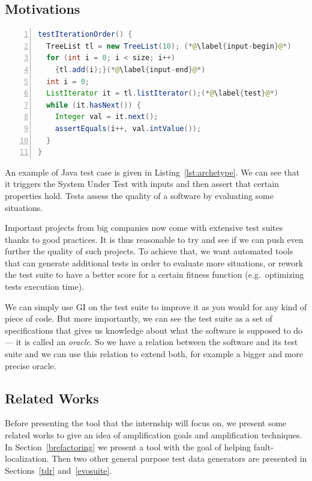 \documentclass[11pt]{sdm}
\newcommand{\addref}[1]{\colorbox{TealBlue!100}{\textcolor{white}{\textbf{$[$\ifx&#1&\ \else#1\fi$]$}}}}
\begin{document}

\subsection{Motivations}
\label{motiv_tsa}

\begin{lstlisting}[caption={An archetypal example of an object-oriented test case  (taken from the Apache Commons Collections, in the class TreeListTest, line 270)},label=lst:archetype,float,language=java,numbers=left]
testIterationOrder() {
  TreeList tl = new TreeList(10); (*@\label{input-begin}@*)
  for (int i = 0; i < size; i++)
    {tl.add(i);}(*@\label{input-end}@*)
  int i = 0;
  ListIterator it = tl.listIterator();(*@\label{test}@*)
  while (it.hasNext()) {
    Integer val = it.next();
    assertEquals(i++, val.intValue());
  }
}
\end{lstlisting}

An example of Java test case is given in Listing~\ref{lst:archetype}.
We can see that it triggers the System Under Test with inputs and then assert that certain properties hold.
Tests assess the quality of a software by evaluating some situations.

Important projects from big companies now come with extensive test suites thanks to good practices.
It is thus reasonable to try and see if we can push even further the quality of such projects.
To achieve that, we want automated tools that can generate additional tests in order to evaluate more situations, or rework the test suite to have a better score for a certain fitness function (e.g.\ optimizing tests execution time).

We can simply use GI on the test suite to improve it as you would for any kind of piece of code.
But more importantly, we can see the test suite as a set of specifications that gives us knowledge about what the software is supposed to do --- it is called an \textit{oracle}.
So we have a relation between the software and its test suite and we can use this relation to extend both, for example a bigger and more precise oracle.


\subsection{Related Works}
\label{related}
Before presenting the tool that the internship will focus on, we present some related works to give an idea of amplification goals and amplification techniques.
In Section~\ref{brefactoring} we present a tool with the goal of helping fault-localization.
Then two other general purpose test data generators are presented in Sections~\ref{tdr} and~\ref{evosuite}.
\end{document}
